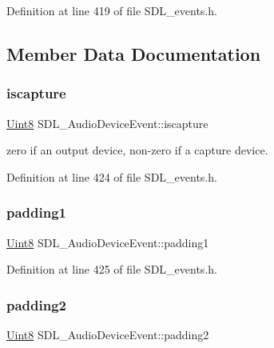 Definition at line 419 of file S\+D\+L\+\_\+events.\+h.



\subsection{Member Data Documentation}
\mbox{\label{struct_s_d_l___audio_device_event_a1482dcd50b47046ef8e9bfa7cc7457d9}} 
\subsubsection{\texorpdfstring{iscapture}{iscapture}}
{\footnotesize\ttfamily \mbox{\hyperlink{_s_d_l__stdinc_8h_a2944638813a090aa23e62f4da842c3e2}{Uint8}} S\+D\+L\+\_\+\+Audio\+Device\+Event\+::iscapture}

zero if an output device, non-\/zero if a capture device. 

Definition at line 424 of file S\+D\+L\+\_\+events.\+h.

\mbox{\label{struct_s_d_l___audio_device_event_ad6efdec7189e735f4a05fc123c0cb723}} 
\subsubsection{\texorpdfstring{padding1}{padding1}}
{\footnotesize\ttfamily \mbox{\hyperlink{_s_d_l__stdinc_8h_a2944638813a090aa23e62f4da842c3e2}{Uint8}} S\+D\+L\+\_\+\+Audio\+Device\+Event\+::padding1}



Definition at line 425 of file S\+D\+L\+\_\+events.\+h.

\mbox{\label{struct_s_d_l___audio_device_event_adf9bebd56d707860045d31359535a2a4}} 
\subsubsection{\texorpdfstring{padding2}{padding2}}
{\footnotesize\ttfamily \mbox{\hyperlink{_s_d_l__stdinc_8h_a2944638813a090aa23e62f4da842c3e2}{Uint8}} S\+D\+L\+\_\+\+Audio\+Device\+Event\+::padding2}



